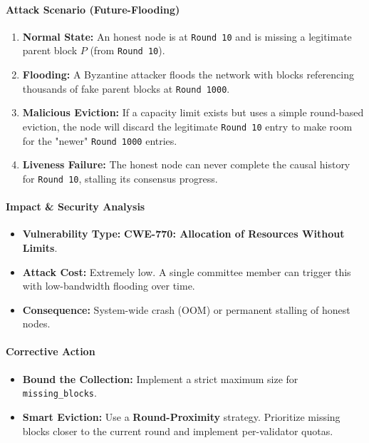 \documentclass{article}
\theoremstyle{plain}
\theoremstyle{definition}
\theoremstyle{remark}
\begin{document}
{\paragraph{Attack Scenario (Future-Flooding)}
\begin{enumerate}
    \item \textbf{Normal State:} An honest node is at \texttt{Round 10} and is missing a legitimate parent block $P$ (from \texttt{Round 10}).
    \item \textbf{Flooding:} A Byzantine attacker floods the network with blocks referencing thousands of fake parent blocks at \texttt{Round 1000}.
    \item \textbf{Malicious Eviction:} If a capacity limit exists but uses a simple round-based eviction, the node will discard the legitimate \texttt{Round 10} entry to make room for the "newer" \texttt{Round 1000} entries.
    \item \textbf{Liveness Failure:} The honest node can never complete the causal history for \texttt{Round 10}, stalling its consensus progress.
\end{enumerate}

\paragraph{Impact \& Security Analysis}
\begin{itemize}
    \item \textbf{Vulnerability Type:} \textbf{CWE-770: Allocation of Resources Without Limits}.
    \item \textbf{Attack Cost:} Extremely low. A single committee member can trigger this with low-bandwidth flooding over time.
    \item \textbf{Consequence:} System-wide crash (OOM) or permanent stalling of honest nodes.
\end{itemize}

\paragraph{Corrective Action}
\begin{itemize}
    \item \textbf{Bound the Collection:} Implement a strict maximum size for \texttt{missing\_blocks}.
    \item \textbf{Smart Eviction:} Use a \textbf{Round-Proximity} strategy. Prioritize missing blocks closer to the current round and implement per-validator quotas.
\end{itemize}
}
\end{document}
